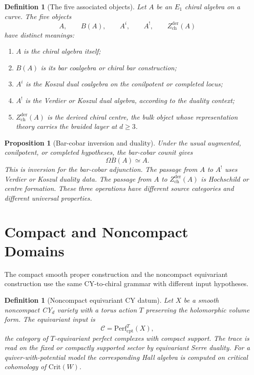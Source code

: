 \documentclass[11pt]{article}
\newtheorem{proposition}[theorem]{Proposition}
\newtheorem{definition}[theorem]{Definition}
\providecommand{\Perf}{\mathrm{Perf}}
\providecommand{\cC}{\mathcal{C}}
\providecommand{\Crit}{\mathrm{Crit}}
\providecommand{\Zchder}{Z^{\mathrm{der}}_{\mathrm{ch}}}
\begin{document}
\begin{definition}[The five associated objects]
\label{def:five-objects}
Let $A$ be an $E_1$ chiral algebra on a curve.  The five objects
\[
 A,\qquad B(A),\qquad A^i,\qquad A^!,\qquad \Zchder(A)
\]
have distinct meanings:
\begin{enumerate}[label=\textup{(\roman*)}]
 \item $A$ is the chiral algebra itself;
 \item $B(A)$ is its bar coalgebra or chiral bar construction;
 \item $A^i$ is the Koszul dual coalgebra on the conilpotent or
 completed locus;
 \item $A^!$ is the Verdier or Koszul dual algebra, according to the
 duality context;
 \item $\Zchder(A)$ is the derived chiral centre, the bulk object whose
 representation theory carries the braided layer at $d\geq 3$.
\end{enumerate}
\end{definition}

\begin{proposition}[Bar-cobar inversion and duality]
\label{prop:bar-cobar-five}
Under the usual augmented, conilpotent, or completed hypotheses, the
bar-cobar counit gives
\[
 \Omega B(A)\simeq A .
\]
This is inversion for the bar-cobar adjunction.  The passage from $A$ to
$A^!$ uses Verdier or Koszul duality data.  The passage from $A$ to
$\Zchder(A)$ is Hochschild or centre formation.  These three operations
have different source categories and different universal properties.
\end{proposition}

\section{Compact and Noncompact Domains}

The compact smooth proper construction and the noncompact equivariant
construction use the same CY-to-chiral grammar with different input
hypotheses.

\begin{definition}[Noncompact equivariant CY datum]
\label{def:noncompact-cy}
Let $X$ be a smooth noncompact CY$_d$ variety with a torus action
$T$ preserving the holomorphic volume form.  The equivariant input is
\[
 \cC=\Perf^T_{\mathrm{cpt}}(X),
\]
the category of $T$-equivariant perfect complexes with compact support.
The trace is read on the fixed or compactly supported sector by
equivariant Serre duality.  For a quiver-with-potential model the
corresponding Hall algebra is computed on critical cohomology of
$\Crit(W)$.
\end{definition}
\end{document}
